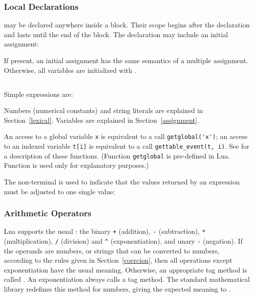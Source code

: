\subsubsection{Local Declarations} \label{localvar}
 may be declared anywhere inside a block.
Their scope begins after the declaration and lasts until the
end of the block.
The declaration may include an initial assignment:
\begin{Produc}
\end{Produc}%
If present, an initial assignment has the same semantics
of a multiple assignment.
Otherwise, all variables are initialized with \nil.


\subsection{}

\subsubsection{}
Simple expressions are:
\begin{Produc}
\end{Produc}%
Numbers (numerical constants) and
string literals are explained in Section~\ref{lexical}.
Variables are explained in Section~\ref{assignment}.

An access to a global variable \verb|x| is equivalent to a
call \verb|getglobal('x')|;
an access to an indexed variable \verb|t[i]| is equivalent to
a call \verb|gettable_event(t, i)|.
See  for a description of these functions.
(Function \verb|getglobal| is pre-defined in Lua.
Function  is used only for explanatory purposes.)

The non-terminal  is used to indicate that the values
returned by an expression must be adjusted to one single value:
\begin{Produc}
\end{Produc}

\subsubsection{Arithmetic Operators}
Lua supports the usual :
the binary \verb|+| (addition),
\verb|-| (subtraction), \verb|*| (multiplication),
\verb|/| (division) and \verb|^| (exponentiation),
and unary \verb|-| (negation).
If the operands are numbers, or strings that can be converted to
numbers, according to the rules given in Section~\ref{coercion},
then all operations except exponentiation have the usual meaning.
Otherwise, an appropriate tag method is called .
An exponentiation always calls a tag method.
The standard mathematical library redefines this method for numbers,
giving the expected meaning to 
.

